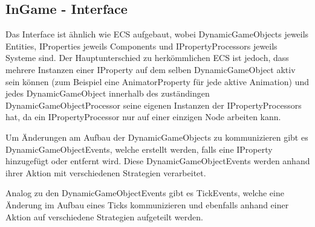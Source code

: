 \subsection{InGame - Interface}

Das Interface ist ähnlich wie ECS aufgebaut, wobei DynamicGameObjects jeweils Entities, IProperties jeweils Components und IPropertyProcessors jeweils Systeme sind.
Der Hauptunterschied zu herkömmlichen ECS ist jedoch, dass mehrere Instanzen einer IProperty auf dem selben DynamicGameObject aktiv sein können
(zum Beispiel eine AnimatorProperty für jede aktive Animation) und jedes DynamicGameObject innerhalb des zuständingen DynamicGameObjectProcessor
seine eigenen Instanzen der IPropertyProcessors hat, da ein IPropertyProcessor nur auf einer einzigen Node arbeiten kann. \par
Um Änderungen am Aufbau der DynamicGameObjects zu kommunizieren gibt es DynamicGameObjectEvents, welche erstellt werden, falls eine IProperty hinzugefügt oder entfernt wird.
Diese DynamicGameObjectEvents werden anhand ihrer Aktion mit verschiedenen Strategien verarbeitet.\par
Analog zu den DynamicGameObjectEvents gibt es TickEvents, welche eine Änderung im Aufbau eines Ticks kommunizieren und ebenfalls anhand einer Aktion auf
verschiedene Strategien aufgeteilt werden.\par